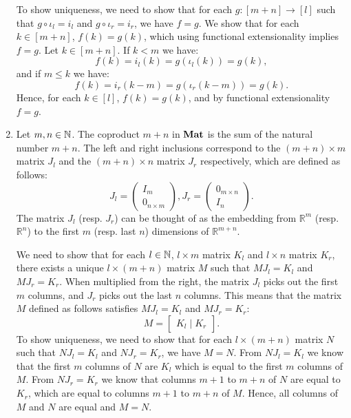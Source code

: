 \begin{solution}
\begin{enumerate}
		To show uniqueness, we need to show that for each $g : [m+n] \to [l]$ such that $g \circ \iota_l = i_l$ and $g \circ \iota_r = i_r$, we have $f = g$. We show that for each $k \in [m+n]$, $f(k) = g(k)$, which using functional extensionality implies $f = g$. 
		Let $k \in [m+n]$. If $k < m$ we have: 
		\[ f(k) = i_l(k) = g (\iota_l (k)) = g(k),\]
		and if $m \leq k$ we have:
		\[ f(k) = i_r(k - m) = g (\iota_r (k - m)) = g(k). \]
		Hence, for each $k \in [l]$, $f(k) = g(k)$, and by functional extensionality $f = g$.
		\item Let $m,n \in \mathbb{N}$. The coproduct $m + n$ in $\mathbf{Mat}$ is the sum of the natural number $m + n$. The left and right inclusions correspond to the $(m+n) \times m$ matrix $J_l$ and the $(m+n) \times n$ matrix $J_r$ respectively, which are defined as follows:
		\[
		J_l = 
		\begin{pmatrix}
			I_m \\ 
			0_{n \times m}
		\end{pmatrix},
		J_r = 
		\begin{pmatrix}
			0_{m \times n} \\
			I_n
		\end{pmatrix}.
		\]
		The matrix $J_l$ (resp. $J_r$) can be thought of as the embedding from $\mathbb{R}^{m}$ (resp. $\mathbb{R}^{n}$) to the first $m$ (resp. last $n$) dimensions of $\mathbb{R}^{m+n}$.

		We need to show that for each $l \in \mathbb{N}$, $l \times m$ matrix $K_l$ and $l \times n$ matrix $K_r$, there exists a unique $l \times (m + n)$ matrix $M$ such that $M J_l = K_l$ and $M J_r = K_r$. 
		When multiplied from the right, the matrix $J_l$ picks out the first $m$ columns, and $J_r$ picks out the last $n$ columns. This means that the matrix $M$ defined as follows satisfies $M J_l = K_l$ and $M J_r = K_r$:
		\[
		M = 
		\begin{bmatrix}
			K_l \mid K_r
		\end{bmatrix}.
		\]
		To show uniqueness, we need to show that for each $l \times (m+n)$ matrix $N$ such that $N J_l = K_l$ and $N J_r = K_r$, we have $M=N$.
		From $N J_l = K_l$ we know that the first $m$ columns of $N$ are $K_l$ which is equal to the first $m$ columns of $M$. From $N J_r = K_r$ we know that columns $m+1$ to $m+n$ of $N$ are equal to $K_r$, which are equal to columns $m+1$ to $m+n$ of $M$. Hence, all columns of $M$ and $N$ are equal and $M =N$.
	\end{enumerate}
\end{solution}


